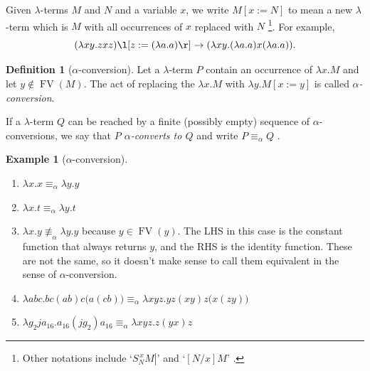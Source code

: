\documentclass[a4paper, 11pt]{article}
\theoremstyle{plain}
\theoremstyle{definition}
\newtheorem{defn}{Definition}[section]
\newtheorem{example}{Example}[section]
\theoremstyle{remark}
\newcommand\acong{\equiv_\alpha}
\newcommand\FV{\operatorname{FV}}
\begin{document}
Given $\lambda$-terms $M$ and $N$ and a variable $x$, we write $M [x := N]$ to mean a new $\lambda$-term which is $M$ with all occurrences of $x$ replaced with $N$ \parencite[p.~27]{barendregt-1981-lambda-calculus}\footnote{Other notations include `$\left. S_N^{\,x} M \right\vert$' \parencites[p.~9]{church-1941-calculi-lambda-conversion}{church-rosser-1936-some-properties-of-conversion} and `$[N / x] M$' \parencites[p.~7]{hindley-seldin-2008-lambda-calculus-and-combinators}[\S\textbf{2}C2]{curry-feys-1958-combinatory-logic-volume-1}.}. For example, \[ (\lambda x y . z x z) \l[ z := (\lambda a . a) \r] \rightarrow (\lambda x y . (\lambda a . a) x (\lambda a . a)). \]

\begin{defn}[$\alpha$-conversion]\label{def:alpha-conversion}
Let a $\lambda$-term $P$ contain an occurrence of $\lambda x . M$ and let $y \notin \FV(M)$. The act of replacing the $\lambda x . M$ with $\lambda y . M [x := y]$ is called \textit{$\alpha$-conversion}.

If a $\lambda$-term $Q$ can be reached by a finite (possibly empty) sequence of $\alpha$-conversions, we say that \textit{$P$ $\alpha$-converts to $Q$} and write $P \acong Q$ \parencite[p.~9]{hindley-seldin-2008-lambda-calculus-and-combinators}.
\end{defn}

\begin{example}[$\alpha$-conversion]\label{ex:alpha-conversion}\leavevmode
\begin{enumerate}[(1)]
\item $\lambda x . x \acong \lambda y . y$

\item $\lambda x . t \acong \lambda y . t$

\item $\lambda x . y \not\acong \lambda y . y$ because $y \in \FV(y)$. The LHS in this case is the constant function that always returns $y$, and the RHS is the identity function. These are not the same, so it doesn't make sense to call them equivalent in the sense of $\alpha$-conversion.

\item $\lambda a b c . bc (ab) c \big( a(cb) \big) \acong \lambda x y z . yz (xy) z \big( x(zy) \big)$

\item $\lambda g_2 j a_{16} . a_{16} (j g_2) a_{16} \acong \lambda x y z . z (yx) z$
\end{enumerate}
\end{example}
\end{document}

